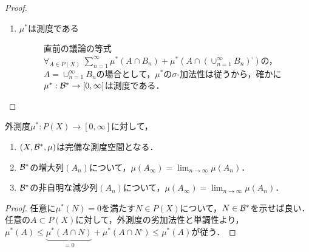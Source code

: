 \documentclass[uplatex, dvipdfmx]{jsreport}
\begin{document}
\begin{proof}
\begin{enumerate}
        \item \begin{description}
            \item[$\mu^*$は測度である] 直前の議論の等式$\forall_{A\in P(X)}\;\sum^\infty_{n=1}\mu^*(A\cap B_n)+\mu^*(A\cap(\cup^\infty_{n=1}B_n)^\comp)$の，$A=\cup^\infty_{n=1}B_n$の場合として，$\mu^*$の$\sigma$-加法性は従うから，確かに$\mu^*:\mathcal{B}^*\to[0,\infty]$は測度である．
        \end{description}
    \end{enumerate}
\end{proof}

\begin{theorem}[完備性]
    外測度$\mu^*:P(X)\to[0,\infty]$に対して，
    \begin{enumerate}
        \item $(X,\mathcal{B}^*,\mu)$は完備な測度空間となる．
        \item $\mathcal{B}^*$の増大列$(A_n)$について，$\mu(A_\infty)=\lim_{n\to\infty}\mu(A_n)$．
        \item $\mathcal{B}^*$の非自明な減少列$(A_n)$について，$\mu(A_\infty)=\lim_{n\to\infty}\mu(A_n)$．
    \end{enumerate}
\end{theorem}
\begin{proof}
    任意に$\mu^*(N)=0$を満たす$N\in P(X)$について，$N\in\mathcal{B}^*$を示せば良い．任意の$A\subset P(X)$に対して，外測度の劣加法性と単調性より，$\mu^*(A)\le\underbrace{\mu^*(A\cap N)}_{=0}+\mu^*(A\cap N^\comp)\le\mu^*(A)$が従う．
\end{proof}
\end{document}
